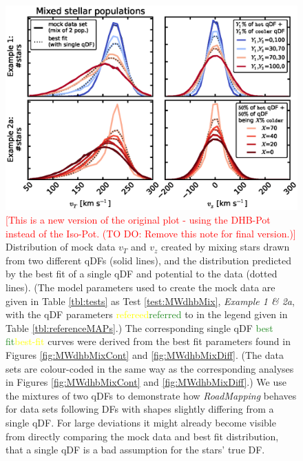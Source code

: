 \documentclass[iop,revtex4,numberedappendix,appendixfloats]{emulateapj}
\newcommand{\RM}{{\sl RoadMapping}}
\newcommand{\NEW}[1]{\textcolor{ForestGreen}{#1}}
\newcommand{\OLD}[1]{\textcolor{Yellow}{#1}}%
\newcommand{\NOTE}[1]{\textcolor{Red}{#1}}
\begin{document}
\begin{figure}[!htbp]
\centering
\includegraphics[width=\columnwidth]{figs/MWdhbMix_mockdata_residuals.eps}
\caption{\NOTE{[This is a new version of the original plot - using the DHB-Pot instead of the Iso-Pot. (TO DO: Remove this note for final version.)]} Distribution of mock data $v_T$ and $v_z$ created by mixing stars drawn from two different qDFs (solid lines), and the distribution predicted by the best fit of a single qDF and potential to the data (dotted lines). (The model parameters used to create the mock data are given in Table \ref{tbl:tests} as Test \ref{test:MWdhbMix}, \emph{Example 1 \& 2a}, with the qDF parameters \OLD{refereed}\NEW{referred} to in the legend given in Table \ref{tbl:referenceMAPs}.) The corresponding single qDF \NEW{best fit}\OLD{best-fit} curves were derived from the best fit parameters found in Figures \ref{fig:MWdhbMixCont} and \ref{fig:MWdhbMixDiff}. (The data sets are colour-coded in the same way as the corresponding analyses in Figures  \ref{fig:MWdhbMixCont} and \ref{fig:MWdhbMixDiff}.) We use the mixtures of two qDFs to demonstrate how \RM{} behaves for data sets following DFs with shapes slightly differing from a single qDF. For large deviations it might already become visible from directly comparing the mock data and best fit distribution, that a single qDF is a bad assumption for the stars' true DF.}
\label{fig:MWdhbMix_mockdata_residuals}
\end{figure}
\end{document}
